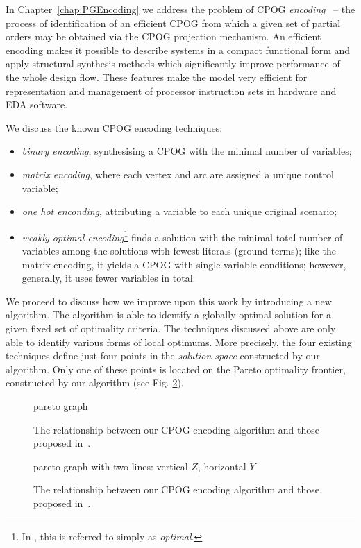 In Chapter~\ref{chap:PGEncoding} we address the problem of CPOG \emph{encoding}~\cite{2009_mokhov_phd} -- the process of identification of an efficient CPOG from which a given set of partial orders may be obtained via the CPOG projection mechanism. An efficient encoding makes it possible to describe systems in
a compact functional form and apply structural synthesis methods which
significantly improve performance of the whole design flow. These
features make the model very efficient for representation and management
of processor instruction sets in hardware and EDA software. 

We discuss the known CPOG encoding techniques:
\begin{itemize}
\item \emph{binary encoding}, synthesising a CPOG with the minimal number of variables;
\item \emph{matrix encoding}, where each vertex and arc are assigned a unique control variable;
\item \emph{one hot enconding}, attributing a variable to each unique original scenario;
\item \emph{weakly optimal encoding}\footnote{In \cite{2009_mokhov_phd}, this is referred to simply as \emph{optimal}.} finds a solution with the minimal total number of variables among the solutions with fewest literals (ground terms); like the matrix encoding, it yields a CPOG with single variable conditions; however, generally, it uses fewer variables in total.    
\end{itemize}

We proceed to discuss how we improve upon this work by introducing a new algorithm. The algorithm is able to identify a globally optimal solution for a given fixed set of optimality criteria. The techniques discussed above are only able to identify various forms of local optimums. More precisely, the four existing techniques define just four points in the \emph{solution space} constructed by our algorithm. Only one of these points is located on the Pareto optimality frontier, constructed by our algorithm (see Fig. \ref{fig:pareto}).

\begin{figure}[t]
{\huge{pareto graph}}
\label{fig:pareto}
\caption{The relationship between our CPOG encoding algorithm and those proposed in~\cite{2009_mokhov_phd}.}
\end{figure} 
 
\begin{figure}[t]
{\huge{pareto graph with two lines: vertical $Z$, horizontal $Y$}}
\label{fig:pareto}
\caption{The relationship between our CPOG encoding algorithm and those proposed in~\cite{2009_mokhov_phd}.}
\end{figure} 

